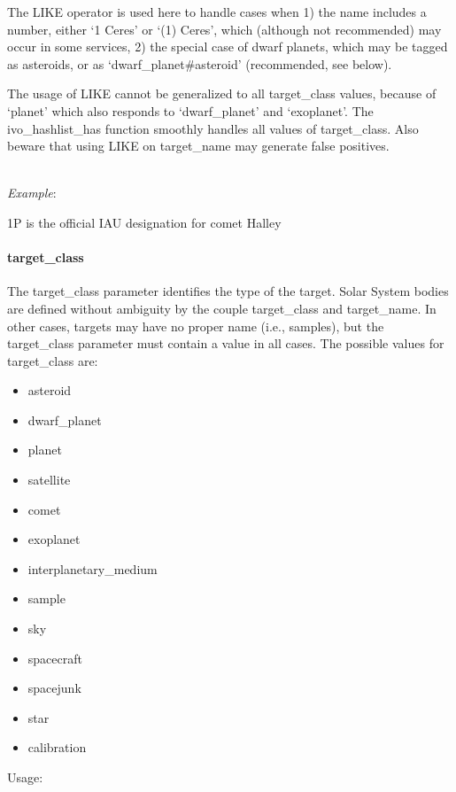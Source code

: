 \documentclass[11pt,a4paper]{ivoa}
\begin{document}
The LIKE operator is used here to handle cases when 1) the name includes a
number, either `1 Ceres' or `(1) Ceres', which (although not recommended)
may occur in some services, 2) the special case of dwarf planets, which
may be tagged as asteroids, or as `dwarf\_planet\#asteroid' (recommended,
see below).

The usage of LIKE cannot be generalized to all target\_class values,
because of  `planet' which also responds to `dwarf\_planet' and `exoplanet'.
The ivo\_hashlist\_has function smoothly handles all values
of target\_class. Also beware that using LIKE on target\_name may generate false positives.

\textbf{\\}
\emph{Example}:

1P is the official IAU designation for comet Halley

\paragraph{target\_class}

The target\_class parameter identifies the type of the target. Solar
System bodies are defined without ambiguity by the couple target\_class
and target\_name. In other cases, targets may have no proper name
(i.e., samples), but the target\_class parameter must contain a value in
all cases. The possible values for target\_class are:

\begin{itemize}
\item asteroid
\item dwarf\_planet
\item planet
\item satellite
\item comet
\item exoplanet
\item interplanetary\_medium
\item sample
\item sky
\item spacecraft
\item spacejunk
\item star
\item calibration
\end{itemize}

Usage:
\end{document}

